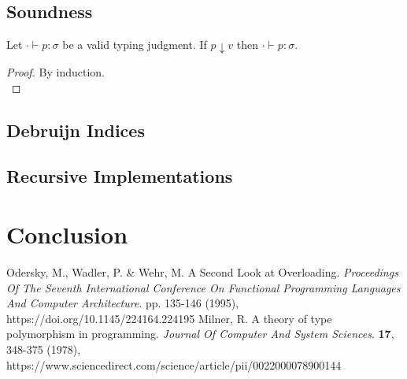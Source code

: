 \documentclass[runningheads]{llncs}
\begin{document}
\subsection{Soundness}
Let $\cdot \vdash p : \sigma$ be a valid typing judgment. If $p \downarrow v$ then $\cdot \vdash p : \sigma$.
\begin{proof} By induction. \\

\end{proof}
\subsection{Debruijn Indices}
\subsection{Recursive Implementations}
\section{Conclusion}

\begin{thebibliography}{8}

Odersky, M., Wadler, P. \& Wehr, M. A Second Look at Overloading. {\em Proceedings Of The Seventh International Conference On Functional Programming Languages And Computer Architecture}. pp. 135-146 (1995), https://doi.org/10.1145/224164.224195
Milner, R. A theory of type polymorphism in programming. {\em Journal Of Computer And System Sciences}. \textbf{17}, 348-375 (1978), https://www.sciencedirect.com/science/article/pii/0022000078900144
\end{thebibliography}
\end{document}
